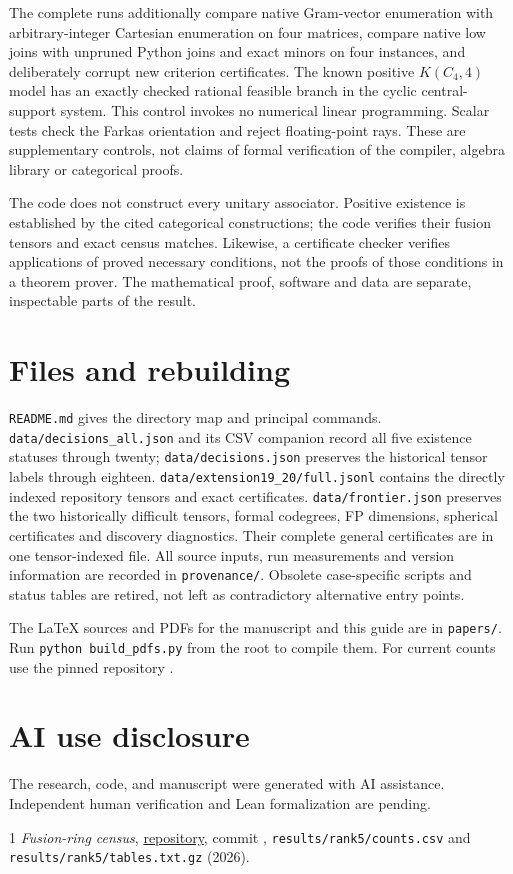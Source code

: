 \documentclass[11pt]{article}
\begin{document}
The complete runs additionally compare native Gram-vector enumeration
with arbitrary-integer Cartesian enumeration on four matrices, compare
native low joins with unpruned Python joins and exact minors on four
instances, and deliberately corrupt new
criterion certificates. The known positive $K(C_4,4)$ model has an exactly checked rational
feasible branch in the cyclic central-support system. This control invokes
no numerical linear programming. Scalar tests check the Farkas
orientation and reject floating-point rays. These are supplementary
controls, not claims of formal verification of the compiler, algebra
library or categorical proofs.

The code does not construct every unitary associator. Positive existence
is established by the cited categorical constructions; the code verifies
their fusion tensors and exact census matches. Likewise, a certificate
checker verifies applications of proved necessary conditions, not the
proofs of those conditions in a theorem prover. The mathematical proof,
software and data are separate, inspectable parts of the result.

\section{Files and rebuilding}
\texttt{README.md} gives the directory map and principal commands.
\texttt{data/decisions\_all.json} and its CSV companion record all five
existence statuses through twenty; \texttt{data/decisions.json} preserves
the historical tensor labels through eighteen.
\texttt{data/extension19\_20/full.jsonl} contains the directly indexed
repository tensors and exact certificates.
\texttt{data/frontier.json} preserves the two historically difficult tensors,
formal codegrees, FP dimensions, spherical certificates and discovery
diagnostics. Their complete general certificates are in one tensor-indexed
file. All source inputs, run measurements and version information are
recorded in \texttt{provenance/}. Obsolete case-specific scripts and
status tables are retired, not left as contradictory alternative entry
points.

The LaTeX sources and PDFs for the manuscript and this guide are in
\texttt{papers/}. Run \texttt{python build\_pdfs.py} from the
root to compile them. For current counts use the pinned repository
\cite{Census}.

\section*{AI use disclosure}
The research, code, and manuscript were generated with AI assistance. Independent human verification and Lean formalization are pending.
\begin{thebibliography}{1}
\sloppy
{} \emph{Fusion-ring census},
\href{https://github.com/sebastienpalcoux/fusion-ring-census/tree/b86eb6dc6eeeafe5fc5f6906d7b074e0322e9726}{repository}, commit ,
\texttt{results/rank5/counts.csv} and \texttt{results/rank5/tables.txt.gz} (2026).
\end{thebibliography}
\end{document}
